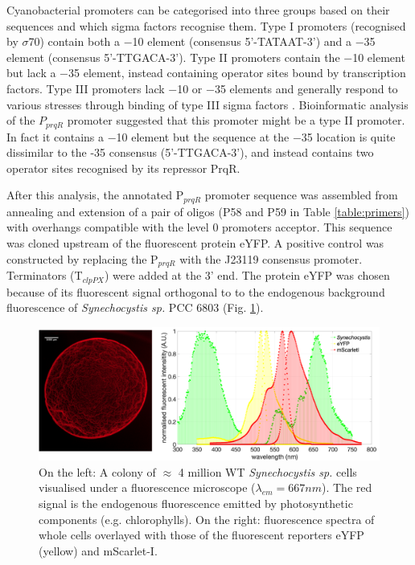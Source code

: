 Cyanobacterial promoters can be categorised into three groups based on their sequences and which sigma factors recognise them. Type I promoters (recognised by $\sigma$70) contain both a −10 element (consensus 5’-TATAAT-3’) and a −35 element (consensus 5’-TTGACA-3’). Type II promoters contain the −10 element but lack a −35 element, instead containing operator sites bound by transcription factors. Type III promoters lack −10 or −35 elements and generally respond to various stresses through binding of type III sigma factors \citep{Gordon2018}.
Bioinformatic analysis of the $P_{prqR}$ promoter suggested that this promoter might be a type II promoter. In fact it contains a −10 element but the sequence at the −35 location is quite dissimilar to the -35 consensus (5’-TTGACA-3’), and instead contains two operator sites recognised by its repressor PrqR.

After this analysis, the annotated P$_{prqR}$ promoter sequence was assembled from annealing and extension of a pair of oligos (P58 and P59 in Table \ref{table:primers}) with overhangs compatible with the level 0 promoters acceptor.
This sequence was cloned upstream of the fluorescent protein eYFP. A positive control was constructed by replacing the P$_{prqR}$ with the J23119 consensus promoter. Terminators (T$_{clpPX}$) were added at the 3' end. 
The protein eYFP was chosen because of its fluorescent signal orthogonal to to the endogenous background fluorescence of \textit{Synechocystis sp.} PCC 6803 (Fig. \ref{fig:fluo}).

\begin{figure}[H]
    \centering
    \includegraphics[width=\hsize]{figs/fspectracells.png}
    \caption{On the left: A colony of $\approx$ 4 million WT \textit{Synechocystis sp.} cells visualised under a fluorescence microscope ($\lambda_{em} = 667 nm$). The red signal is the endogenous fluorescence emitted by photosynthetic components (e.g. chlorophylls). On the right: fluorescence spectra of whole cells overlayed with those of the fluorescent reporters eYFP (yellow) and mScarlet-I.}
    \label{fig:fluo}
\end{figure}

